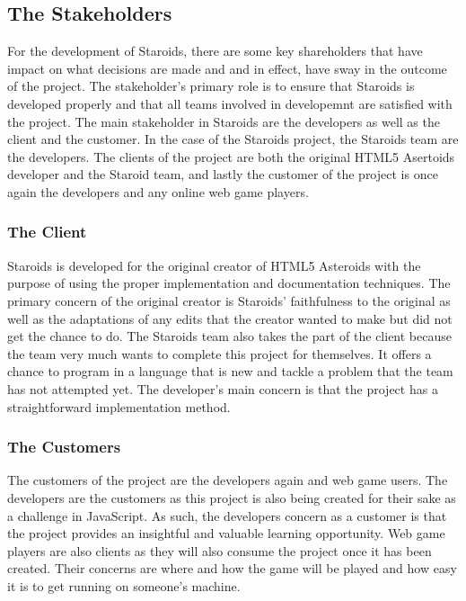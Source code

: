 \documentclass[12pt, titlepage]{article}
\begin{document}
\subsection{The Stakeholders}
For the development of Staroids, there are some key shareholders that have impact on what decisions are made and and in effect, have sway in the outcome of the project. The stakeholder's primary role is to ensure that Staroids is developed properly and that all teams involved in developemnt are satisfied with the project. The main stakeholder in Staroids are the developers as well as the client and the customer. In the case of the Staroids project, the Staroids team are the developers. The clients of the project are both the original HTML5 Asertoids developer and the Staroid team, and lastly the customer of the project is once again the developers and any online web game players.

\subsubsection{The Client}
Staroids is developed for the original creator of HTML5 Asteroids with the purpose of using the proper implementation and documentation techniques. The primary concern of the original creator is Staroids' faithfulness to the original as well as the adaptations of any edits that the creator wanted to make but did not get the chance to do. The Staroids team also takes the part of the client because the team very much wants to complete this project for themselves. It offers a chance to program in a language that is new and tackle a problem that the team has not attempted yet. The developer's main concern is that the project has a straightforward implementation method.

\subsubsection{The Customers}
The customers of the project are the developers again and web game users. The developers are the customers as this project is also being created for their sake as a challenge in JavaScript. As such, the developers concern as a customer is that the project provides an insightful and valuable learning opportunity. Web game players are also clients as they will also consume the project once it has been created. Their concerns are where and how the game will be played and how easy it is to get running on someone's machine.
\end{document}
